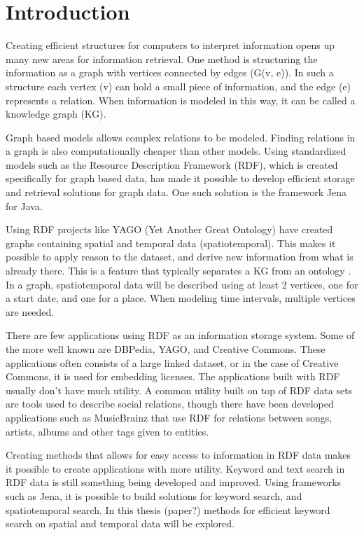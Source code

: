 \chapter{Introduction}
\label{cha:Introduction}

Creating efficient structures for computers to interpret information opens up many new areas for information retrieval. One method is structuring the information as a graph with vertices connected by edges (G(v, e)). In such a structure each vertex (v) can hold a small piece of information, and the edge (e) represents a relation. When information is modeled in this way, it can be called a knowledge graph (KG).

Graph based models allows complex relations to be modeled. Finding relations in a graph is also computationally cheaper than other models. Using standardized models such as the Resource Description Framework (RDF), which is created specifically for graph based data, has made it possible to develop efficient storage and retrieval solutions for graph data. One such solution is the framework Jena \cite{jena2} for Java.

Using RDF projects like YAGO (Yet Another Great Ontology) \cite{yago} have created graphs containing spatial and temporal data (spatiotemporal). This makes it possible to apply reason to the dataset, and derive new information from what is already there. This is a feature that typically separates a KG from an ontology \cite{KGDefYago}. In a graph, spatiotemporal data will be described using at least 2 vertices, one for a start date, and one for a place. When modeling time intervals, multiple vertices are needed.

There are few applications using RDF as an information storage system. Some of the more well known are DBPedia, YAGO, and Creative Commons. These applications often consists of a large linked dataset, or in the case of Creative Commons, it is used for embedding licenses. The applications built with RDF usually don't have much utility. A common utility built on top of RDF data sets are tools used to describe social relations, though there have been developed applications such as MusicBrainz that use RDF for relations between songs, artists, albums and other tags given to entities.

Creating methods that allows for easy access to information in RDF data makes it possible to create applications with more utility. Keyword and text search in RDF data is still something being developed and improved. Using frameworks such as Jena, it is possible to build solutions for keyword search, and spatiotemporal search. In this thesis (paper?) methods for efficient keyword search on spatial and temporal data will be explored.


